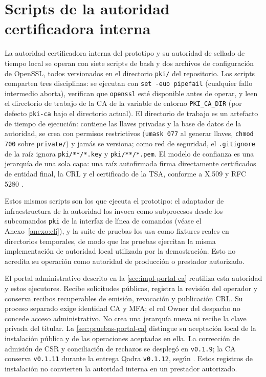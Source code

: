 \chapter{Scripts de la autoridad certificadora interna}\label{anexo:pki}

La autoridad certificadora interna del prototipo y su autoridad de sellado de tiempo local se operan con siete scripts de bash y dos archivos de configuración de OpenSSL, todos versionados en el directorio \texttt{pki/} del repositorio. Los scripts comparten tres disciplinas: se ejecutan con \texttt{set -euo pipefail} (cualquier fallo intermedio aborta), verifican que \texttt{openssl} esté disponible antes de operar, y leen el directorio de trabajo de la CA de la variable de entorno \texttt{PKI\_CA\_DIR} (por defecto \texttt{pki-ca} bajo el directorio actual). El directorio de trabajo es un artefacto de tiempo de ejecución: contiene las llaves privadas y la base de datos de la autoridad, se crea con permisos restrictivos (\texttt{umask 077} al generar llaves, \texttt{chmod 700} sobre \texttt{private/}) y jamás se versiona; como red de seguridad, el \texttt{.gitignore} de la raíz ignora \texttt{pki/**/*.key} y \texttt{pki/**/*.pem}. El modelo de confianza es una jerarquía de una sola capa: una raíz autofirmada firma directamente certificados de entidad final, la CRL y el certificado de la TSA, conforme a X.509 y RFC 5280 \cite{cooper2008}.

Estos mismos scripts son los que ejecuta el prototipo: el adaptador de infraestructura de la autoridad los invoca como subprocesos desde los subcomandos \texttt{pki} de la interfaz de línea de comandos (véase el Anexo~\ref{anexo:cli}), y la suite de pruebas los usa como fixtures reales en directorios temporales, de modo que las pruebas ejercitan la misma implementación de autoridad local utilizada por la demostración. Esto no acredita su operación como autoridad de producción o prestador autorizado.

El portal administrativo descrito en la \cref{sec:impl-portal-ca} reutiliza esta
autoridad y estos ejecutores. Recibe solicitudes p\'ublicas, registra la revisi\'on
del operador y conserva recibos recuperables de emisi\'on, revocaci\'on y
publicaci\'on CRL. Su proceso separado exige identidad CA y MFA; el rol Owner del
despacho no concede acceso administrativo. No crea una jerarqu\'ia nueva ni
recibe la clave privada del titular. La \cref{sec:pruebas-portal-ca} distingue
su aceptaci\'on local de la instalaci\'on p\'ublica y de las operaciones
aceptadas en ella. La correcci\'on de admisi\'on de CSR y conciliaci\'on de
rechazos se despleg\'o en \texttt{v0.1.9}; la CA conserva \texttt{v0.1.11}
durante la entrega Qadra \texttt{v0.1.12}, seg\'un
. Estos registros de instalaci\'on no
convierten la autoridad interna en un prestador autorizado.

